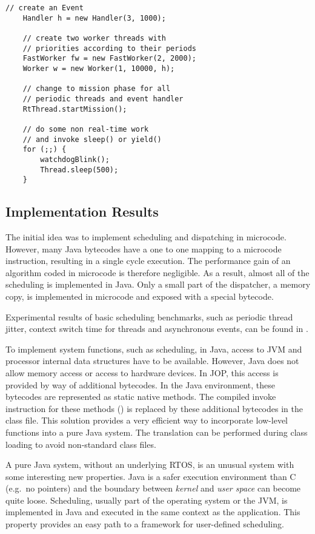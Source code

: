 \begin{lstlisting}[float,caption={Start of the application},
label=lst:arch:rt:profile:usage]
    // create an Event
    Handler h = new Handler(3, 1000);

    // create two worker threads with
    // priorities according to their periods
    FastWorker fw = new FastWorker(2, 2000);
    Worker w = new Worker(1, 10000, h);

    // change to mission phase for all
    // periodic threads and event handler
    RtThread.startMission();

    // do some non real-time work
    // and invoke sleep() or yield()
    for (;;) {
        watchdogBlink();
        Thread.sleep(500);
    }
\end{lstlisting}

\subsection{Implementation Results}

The initial idea was to implement scheduling and dispatching in
microcode. However, many Java bytecodes have a one to one mapping to
a microcode instruction, resulting in a single cycle execution. The
performance gain of an algorithm coded in microcode is therefore
negligible. As a result, almost all of the scheduling is implemented
in Java. Only a small part of the dispatcher, a memory copy, is
implemented in microcode and exposed with a special bytecode.

Experimental results of basic scheduling benchmarks, such as periodic
thread jitter, context switch time for threads and asynchronous
events, can be found in \cite{jop:rtjava}.

To implement system functions, such as scheduling, in Java, access
to JVM and processor internal data structures have to be available.
However, Java does not allow memory access or access to hardware
devices. In JOP, this access is provided by way of additional
bytecodes. In the Java environment, these bytecodes are represented
as static native methods. The compiled invoke instruction for these
methods () is replaced by these additional
bytecodes in the class file. This solution provides a very efficient
way to incorporate low-level functions into a pure Java system. The
translation can be performed during class loading to avoid
non-standard class files.

A pure Java system, without an underlying RTOS, is an unusual system
with some interesting new properties. Java is a safer execution
environment than C (e.g.\ no pointers) and the boundary between
\emph{kernel} and \emph{user space} can become quite loose.
Scheduling, usually part of the operating system or the JVM, is
implemented in Java and executed in the same context as the
application. This property provides an easy path to a framework for
user-defined scheduling.
